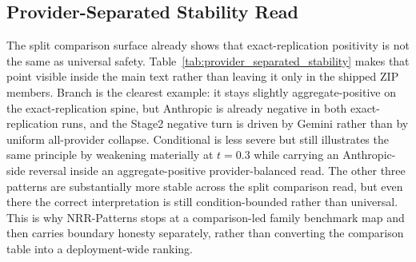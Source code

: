 \documentclass[11pt,a4paper]{article}
\begin{document}
\subsection{Provider-Separated Stability Read}

The split comparison surface already shows that exact-replication positivity is not the same as universal safety. Table~\ref{tab:provider_separated_stability} makes that point visible inside the main text rather than leaving it only in the shipped ZIP members. Branch is the clearest example: it stays slightly aggregate-positive on the exact-replication spine, but Anthropic is already negative in both exact-replication runs, and the Stage2 negative turn is driven by Gemini rather than by uniform all-provider collapse. Conditional is less severe but still illustrates the same principle by weakening materially at \(t=0.3\) while carrying an Anthropic-side reversal inside an aggregate-positive provider-balanced read. The other three patterns are substantially more stable across the split comparison read, but even there the correct interpretation is still condition-bounded rather than universal. This is why NRR-Patterns stops at a comparison-led family benchmark map and then carries boundary honesty separately, rather than converting the comparison table into a deployment-wide ranking.
\end{document}

